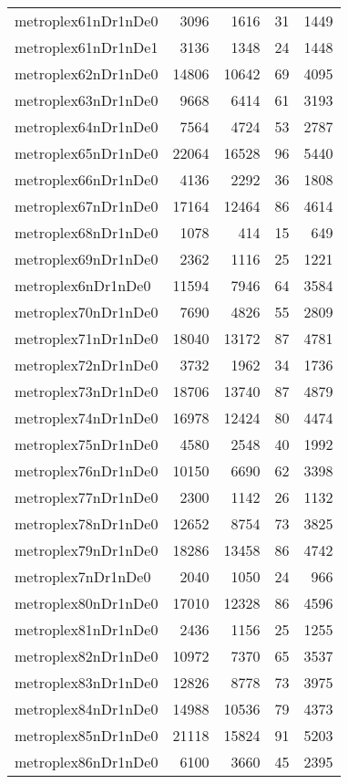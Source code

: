 \begin{longtable}{lrrrr}
metroplex61nDr1nDe0 & 3096 & 1616 & 31 & 1449 \\
metroplex61nDr1nDe1 & 3136 & 1348 & 24 & 1448 \\
metroplex62nDr1nDe0 & 14806 & 10642 & 69 & 4095 \\
metroplex63nDr1nDe0 & 9668 & 6414 & 61 & 3193 \\
metroplex64nDr1nDe0 & 7564 & 4724 & 53 & 2787 \\
metroplex65nDr1nDe0 & 22064 & 16528 & 96 & 5440 \\
metroplex66nDr1nDe0 & 4136 & 2292 & 36 & 1808 \\
metroplex67nDr1nDe0 & 17164 & 12464 & 86 & 4614 \\
metroplex68nDr1nDe0 & 1078 & 414 & 15 & 649 \\
metroplex69nDr1nDe0 & 2362 & 1116 & 25 & 1221 \\
metroplex6nDr1nDe0 & 11594 & 7946 & 64 & 3584 \\
metroplex70nDr1nDe0 & 7690 & 4826 & 55 & 2809 \\
metroplex71nDr1nDe0 & 18040 & 13172 & 87 & 4781 \\
metroplex72nDr1nDe0 & 3732 & 1962 & 34 & 1736 \\
metroplex73nDr1nDe0 & 18706 & 13740 & 87 & 4879 \\
metroplex74nDr1nDe0 & 16978 & 12424 & 80 & 4474 \\
metroplex75nDr1nDe0 & 4580 & 2548 & 40 & 1992 \\
metroplex76nDr1nDe0 & 10150 & 6690 & 62 & 3398 \\
metroplex77nDr1nDe0 & 2300 & 1142 & 26 & 1132 \\
metroplex78nDr1nDe0 & 12652 & 8754 & 73 & 3825 \\
metroplex79nDr1nDe0 & 18286 & 13458 & 86 & 4742 \\
metroplex7nDr1nDe0 & 2040 & 1050 & 24 & 966 \\
metroplex80nDr1nDe0 & 17010 & 12328 & 86 & 4596 \\
metroplex81nDr1nDe0 & 2436 & 1156 & 25 & 1255 \\
metroplex82nDr1nDe0 & 10972 & 7370 & 65 & 3537 \\
metroplex83nDr1nDe0 & 12826 & 8778 & 73 & 3975 \\
metroplex84nDr1nDe0 & 14988 & 10536 & 79 & 4373 \\
metroplex85nDr1nDe0 & 21118 & 15824 & 91 & 5203 \\
metroplex86nDr1nDe0 & 6100 & 3660 & 45 & 2395 \\

\end{longtable}

